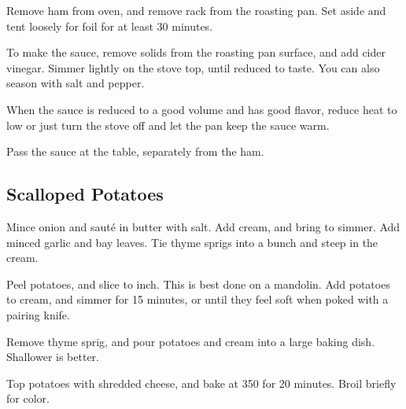 \begin{recipe}

Remove ham from oven, and remove rack from the roasting pan. Set aside and tent loosely for foil for at least 30 minutes.

To make the sauce, remove solids from the roasting pan surface, and add cider vinegar. Simmer lightly on the stove top, until reduced to taste. You can also season with salt and pepper.

When the sauce is reduced to a good volume and has good flavor, reduce heat to low or just turn the stove off and let the pan keep the sauce warm.

Pass the sauce at the table, separately from the ham.

\subsection{Scalloped Potatoes}



Mince onion and sauté in butter with salt. Add cream, and bring to simmer. Add minced garlic and bay leaves. Tie thyme sprigs into a bunch and steep in the cream.


Peel potatoes, and slice to  inch. This is best done on a mandolin. Add potatoes to cream, and simmer for 15 minutes, or until they feel soft when poked with a pairing knife.

Remove thyme sprig, and pour potatoes and cream into a large baking dish. Shallower is better.


Top potatoes with shredded cheese, and bake at 350\degree{} for 20 minutes. Broil briefly for color.

\end{recipe}
